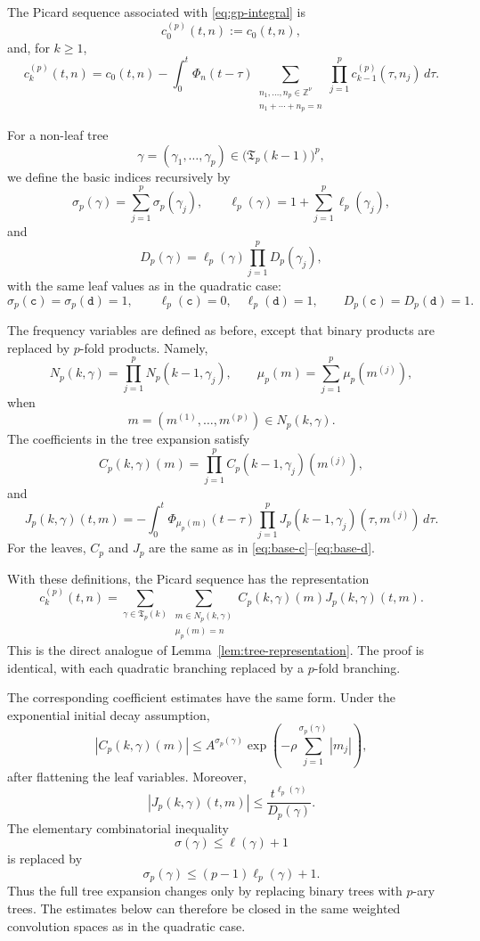 \documentclass[12pt,reqno,tbtags]{amsart}
\newcommand\1{\mathbbm{1}}
\begin{document}
The Picard sequence associated with \eqref{eq:gp-integral} is
\[
c^{(p)}_0(t,n):=c_0(t,n),
\]
and, for $k\ge1$,
\begin{equation}\label{eq:gp-picard}
c^{(p)}_k(t,n)
=
c_0(t,n)
-
\int_0^t\Phi_n(t-\tau)
\sum_{\substack{n_1,\ldots,n_p\in\mathbb Z^\nu\\
n_1+\cdots+n_p=n}}
\prod_{j=1}^p c^{(p)}_{k-1}(\tau,n_j)\,d\tau .
\end{equation}

For a non-leaf tree
\[
\gamma=(\gamma_1,\ldots,\gamma_p)\in\bigl(\mathfrak T_p(k-1)\bigr)^p,
\]
we define the basic indices recursively by
\[
\sigma_p(\gamma)=\sum_{j=1}^p\sigma_p(\gamma_j),
\qquad
\ell_p(\gamma)=1+\sum_{j=1}^p\ell_p(\gamma_j),
\]
and
\[
D_p(\gamma)=\ell_p(\gamma)\prod_{j=1}^pD_p(\gamma_j),
\]
with the same leaf values as in the quadratic case:
\[
\sigma_p(\mathtt c)=\sigma_p(\mathtt d)=1,
\qquad
\ell_p(\mathtt c)=0,\quad \ell_p(\mathtt d)=1,
\qquad
D_p(\mathtt c)=D_p(\mathtt d)=1.
\]

The frequency variables are defined as before, except that binary products are replaced
by $p$-fold products. Namely,
\[
N_p(k,\gamma)
=
\prod_{j=1}^p N_p(k-1,\gamma_j),
\qquad
\mu_p(m)=\sum_{j=1}^p\mu_p(m^{(j)}),
\]
when
\[
m=(m^{(1)},\ldots,m^{(p)})\in N_p(k,\gamma).
\]
The coefficients in the tree expansion satisfy
\[
C_p(k,\gamma)(m)
=
\prod_{j=1}^p C_p(k-1,\gamma_j)(m^{(j)}),
\]
and
\[
J_p(k,\gamma)(t,m)
=
-\int_0^t
\Phi_{\mu_p(m)}(t-\tau)
\prod_{j=1}^p
J_p(k-1,\gamma_j)(\tau,m^{(j)})\,d\tau .
\]
For the leaves, $C_p$ and $J_p$ are the same as in
\eqref{eq:base-c}--\eqref{eq:base-d}.

With these definitions, the Picard sequence has the representation
\begin{equation}\label{eq:p-tree-representation}
c^{(p)}_k(t,n)
=
\sum_{\gamma\in\mathfrak T_p(k)}
\sum_{\substack{m\in N_p(k,\gamma)\\ \mu_p(m)=n}}
C_p(k,\gamma)(m)J_p(k,\gamma)(t,m).
\end{equation}
This is the direct analogue of Lemma~\ref{lem:tree-representation}. The proof is
identical, with each quadratic branching replaced by a $p$-fold branching.

The corresponding coefficient estimates have the same form. Under the exponential
initial decay assumption,
\[
|C_p(k,\gamma)(m)|
\le
A^{\sigma_p(\gamma)}
\exp\left(-\rho\sum_{j=1}^{\sigma_p(\gamma)}|m_j|\right),
\]
after flattening the leaf variables. Moreover,
\[
|J_p(k,\gamma)(t,m)|
\le
\frac{t^{\ell_p(\gamma)}}{D_p(\gamma)}.
\]
The elementary combinatorial inequality
\[
\sigma(\gamma)\le \ell(\gamma)+1
\]
is replaced by
\[
\sigma_p(\gamma)\le (p-1)\ell_p(\gamma)+1.
\]
Thus the full tree expansion changes only by replacing binary trees with $p$-ary
trees. The estimates below can therefore be closed in the same weighted convolution
spaces as in the quadratic case.
\end{document}
